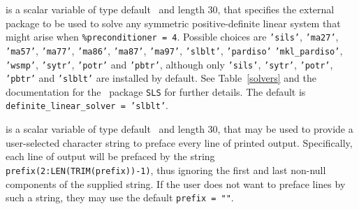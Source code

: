 \documentclass{galahad}
\begin{document}
\begin{description}
 is a scalar variable of type default \character\
and length 30, that specifies the external package to be used to
solve any symmetric positive-definite linear system that might arise
when {\tt \%precondit\-ioner = 4}. Possible choices are
{\tt 'sils'},
{\tt 'ma27'},
{\tt 'ma57'},
{\tt 'ma77'},
{\tt 'ma86'},
{\tt 'ma87'},
{\tt 'ma97'},
{\tt 'slblt'},
{\tt 'pardiso'}
{\tt 'mkl\_pardiso'},
{\tt 'wsmp'},
{\tt 'sytr'},
{\tt 'potr'} and
{\tt 'pbtr'},
although only {\tt 'sils'}, {\tt 'sytr'}, {\tt 'potr'}, {\tt 'pbtr'}
and {\tt 'slblt'} are installed by default.
See Table~\ref{solvers} and
the documentation for the \galahad\ package {\tt SLS} for further details.
The default is {\tt definite\_linear\_solver = 'slblt'}.

 is a scalar variable of type default \character\
and length 30, that may be used to provide a user-selected
character string to preface every line of printed output.
Specifically, each line of output will be prefaced by the string
{\tt prefix(2:LEN(TRIM(prefix))-1)},
thus ignoring the first and last non-null components of the
supplied string. If the user does not want to preface lines by such
a string, they may use the default {\tt prefix = ""}.

\end{description}

\end{document}
